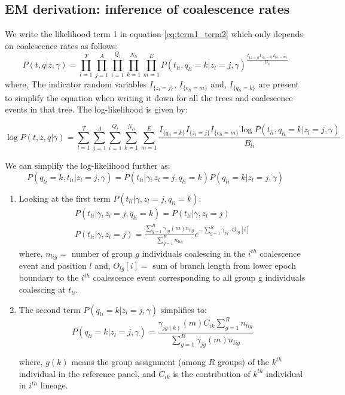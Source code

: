 \subsection{EM derivation: inference of coalescence rates}
We write the likelihood term 1 in equation \ref{eq:term1_term2} which only depends on coalescence rates as follows: 
\begin{equation}
     P(t, q \vert z, \gamma) = \prod_{l = 1}^T \prod_{j = 1}^A \prod_{i = 1}^{Q_l} \prod_{k =1}^{N_{li}} \prod_{m = 1}^E   P(t_{li}, q_{l i} = k \vert z_l = j, \gamma) ^ {\frac{I_{\{z_l = j\}}I_{\{q_{l i} = k\}}  I_{\{e_{l i} = m\}}}{B_{li}}}
\label{eq:scaled_ll}
\end{equation}
where, The indicator random variables $I_{\{z_l = j\}}$, $I_{\{e_{l i} = m\}}$ and, $I_{\{q_{l i} = k\}}$ are present to simplify the equation when writing it down for all the trees and coalescence events in that tree. The log-likelihood is given by:

\begin{equation}
     \log P(t, z, q \vert \gamma) = \sum_{l = 1}^T \sum_{j = 1}^A \sum_{i = 1}^{Q_l} \sum_{k =1}^{N_{li}} \sum_{m = 1}^E  \frac{I_{\{q_{l i} = k\}} I_{\{z_l = j\}} I_{\{e_{l i} = m\}} \log P(t_{li}, q_{l i} = k \vert z_l = j, \gamma)}{B_{li}} 
\end{equation}

We can simplify the log-likelihood further as:
\begin{equation}
    P(q_{li} = k, t_{li} | z_l = j, \gamma ) = P(t_{li} | \gamma, z_l = j, q_{li} = k)P(q_{li} = k | z_l = j, \gamma)
\end{equation}

\begin{enumerate}
    \item Looking at the first term $P(t_{li} | \gamma, z_l = j, q_{li} = k)$:
\begin{align}
    P(t_{li} | \gamma, z_l = j, q_{li} = k) = P(t_{li} | \gamma, z_l = j) \nonumber \\
    P(t_{li} | \gamma, z_l = j) = \frac{\sum_{g=1}^R\gamma_{jg}(m)n_{lig}}{\sum_{g=1}^R n_{lig}}e^{-\sum_{g=1}^R \gamma_{jg} \cdot O_{lg}[i]}
\end{align}
where, $n_{lig} =$  number of group $g$ individuals coalescing in the $i^{th}$ coalescence event and position $l$ and, $O_{lg}[i] =$ sum of branch length from lower epoch boundary to the $i^{th}$ coalescence event corresponding to all group g individuals coalescing at $t_{li}$.
\vspace{3mm}
\item The second term $P(q_{li} = k | z_l = j, \gamma)$ simplifies to:
\begin{equation}
    P(q_{li} = k | z_l = j, \gamma) = \frac{\gamma_{jg(k)}(m)C_{ik}\sum_{g=1}^Rn_{lig}}{\sum_{g=1}^R \gamma_{jg}(m)n_{lig}}
\label{eq:qli}
\end{equation}

where, $g(k)$ means the group assignment (among $R$ groups) of the $k^{th}$ individual in the reference panel, and $C_{ik}$ is the contribution of $k^{th}$ individual in $i^{th}$ lineage. 
\end{enumerate}

